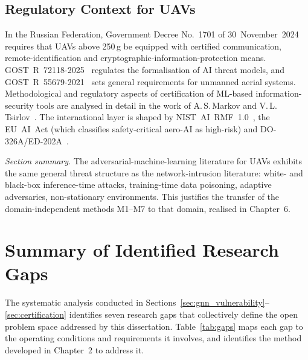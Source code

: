 \subsection{Regulatory Context for UAVs}
In the Russian Federation, Government Decree No.~1701 of
30~November~2024~\cite{decree_1701} requires that UAVs above 250\,g
be equipped with certified communication, remote-identification and
cryptographic-information-protection means.
\mbox{GOST~R~72118-2025}~\cite{GOST_R_72118_2025} regulates the
formalisation of AI threat models, and
\mbox{GOST~R~55679-2021}~\cite{GOST_R_55679_2021} sets general
requirements for unmanned aerial systems. Methodological and
regulatory aspects of certification of ML-based information-security
tools are analysed in detail in the work of A.\,S.\,Markov and
V.\,L.\,Tsirlov~\cite{Markov2023certify}. The international layer is
shaped by \mbox{NIST~AI~RMF~1.0}~\cite{nist_rmf_2023}, the
\mbox{EU~AI~Act} (which classifies safety-critical aero-AI as
high-risk) and \mbox{DO-326A/ED-202A}~\cite{do_326a_2024}.

\medskip
\noindent\textit{Section summary.} The adversarial-machine-learning
literature for UAVs exhibits the same general threat structure as
the network-intrusion literature: white- and black-box inference-time
attacks, training-time data poisoning, adaptive adversaries,
non-stationary environments. This justifies the transfer of the
domain-independent methods \textsf{M1}--\textsf{M7} to that domain,
realised in Chapter~6.

\section{Summary of Identified Research Gaps}
\label{sec:gap_summary}

The systematic analysis conducted in Sections~\ref{sec:gnn_vulnerability}--\ref{sec:certification} identifies seven research gaps that collectively define the open problem space addressed by this dissertation. Table~\ref{tab:gaps} maps each gap to the operating conditions and requirements it involves, and identifies the method developed in Chapter~2 to address it.

